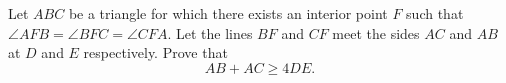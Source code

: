 Let $ABC$ be a triangle for which there exists an interior point $F$ such that $\angle AFB = \angle BFC = \angle CFA$. Let the lines $BF$ and $CF$ meet the sides $AC$ and $AB$ at $D$ and $E$ respectively. Prove that
\[ AB + AC \geq 4DE. \]
